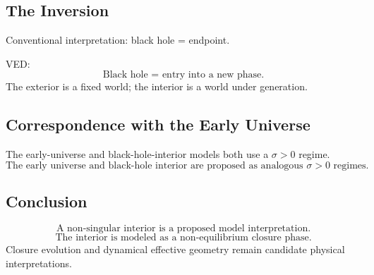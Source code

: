 \subsection{The Inversion}

Conventional interpretation: black hole = endpoint.

VED:
\begin{equation}
  \boxed{\text{Black hole = entry into a new phase.}}
\end{equation}
The exterior is a fixed world; the interior is a world under generation.

\subsection{Correspondence with the Early Universe}

The early-universe and black-hole-interior models both use a $\sigma>0$ regime.
\begin{equation}
  \boxed{
    \text{The early universe and black-hole interior are proposed as
    analogous } \sigma>0 \text{ regimes.}
  }
\end{equation}

\subsection{Conclusion}

\begin{equation}
  \boxed{\text{A non-singular interior is a proposed model interpretation.}}
\end{equation}
\begin{equation}
  \boxed{\text{The interior is modeled as a non-equilibrium closure phase.}}
\end{equation}
Closure evolution and dynamical effective geometry remain candidate physical
interpretations.
